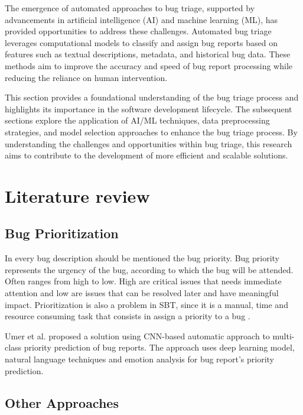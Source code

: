 The emergence of automated approaches to bug triage, supported by advancements in artificial intelligence (AI) and machine learning (ML), has provided opportunities to address these challenges. Automated bug triage leverages computational models to classify and assign bug reports based on features such as textual descriptions, metadata, and historical bug data. These methods aim to improve the accuracy and speed of bug report processing while reducing the reliance on human intervention.

This section provides a foundational understanding of the bug triage process and highlights its importance in the software development lifecycle. The subsequent sections explore the application of AI/ML techniques, data preprocessing strategies, and model selection approaches to enhance the bug triage process. By understanding the challenges and opportunities within bug triage, this research aims to contribute to the development of more efficient and scalable solutions.



\section{Literature review}
\label{sec:literature_review}

\subsection{Bug Prioritization}


In every bug description should be mentioned the bug priority. Bug priority represents the urgency of the bug, according to which the bug will be attended. Often ranges from high to low. High are critical issues that needs immediate attention and low are issues that can be resolved later and have meaningful impact. Prioritization is also a problem in SBT, since it is a manual, time and resource consuming task that consists in assign a priority to a bug \cite{Uddin2017}. 

Umer et al. \cite{Umer2020} proposed a solution using CNN-based automatic approach to multi-class priority prediction of bug reports. The approach uses deep learning model, natural language techniques and emotion analysis for bug report's priority prediction.

\subsection{Other Approaches}

